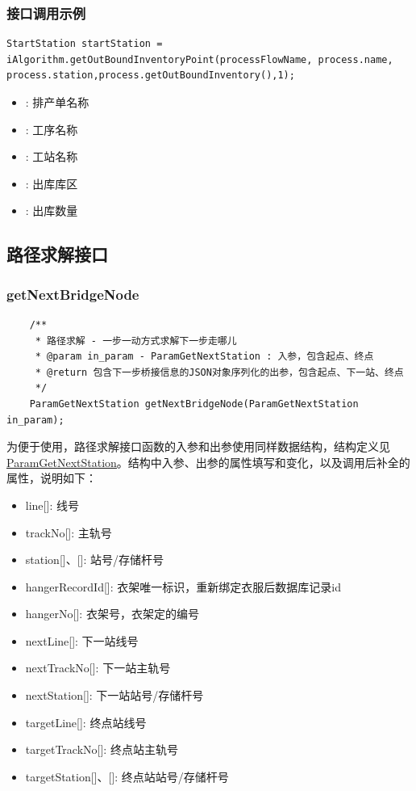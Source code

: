 \subsubsection{接口调用示例}
\begin{lstlisting}
StartStation startStation = iAlgorithm.getOutBoundInventoryPoint(processFlowName, process.name, process.station,process.getOutBoundInventory(),1); 
\end{lstlisting}\vspace{-30pt}
\begin{itemize}
    \item {}: 排产单名称
    \item {}: 工序名称
    \item {}: 工站名称
    \item {}: 出库库区
    \item {}: 出库数量
\end{itemize}
\subsection{路径求解接口}
\subsubsection{getNextBridgeNode}
\begin{lstlisting}
    /**
     * 路径求解 - 一步一动方式求解下一步走哪儿
     * @param in_param - ParamGetNextStation : 入参，包含起点、终点
     * @return 包含下一步桥接信息的JSON对象序列化的出参，包含起点、下一站、终点
     */
    ParamGetNextStation getNextBridgeNode(ParamGetNextStation in_param);
\end{lstlisting}\vspace{-30pt}
为便于使用，路径求解接口函数的入参和出参使用同样数据结构，结构定义见\hyperref[sec:param-getNextStation]{\underline{ParamGetNextStation}}。结构中入参、出参的属性填写和变化，以及调用后补全的属性，说明如下：
\begin{itemize}
	\item {line}[]: 线号
	\item {trackNo}[]: 主轨号
	\item {station}[]、[]: 站号/存储杆号
	\item {hangerRecordId}[]: 衣架唯一标识，重新绑定衣服后数据库记录id
	\item {hangerNo}[]: 衣架号，衣架定的编号
	\item {nextLine}[]: 下一站线号
	\item {nextTrackNo}[]: 下一站主轨号
	\item {nextStation}[]: 下一站站号/存储杆号
	\item {targetLine}[]: 终点站线号
	\item {targetTrackNo}[]: 终点站主轨号
	\item {targetStation}[]、[]: 终点站站号/存储杆号
\end{itemize}
